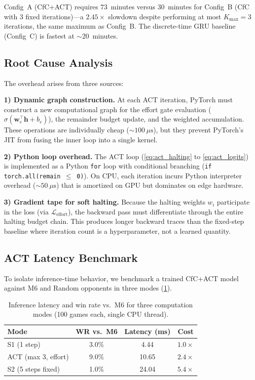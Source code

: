 \documentclass[conference]{IEEEtran}
\begin{document}
Config~A (CfC+ACT) requires $73$~minutes versus $30$~minutes for Config~B (CfC with 3 fixed iterations)---a $2.45\times$ slowdown despite performing at most $K_{\max} = 3$ iterations, the same maximum as Config~B. The discrete-time GRU baseline (Config~C) is fastest at $\sim$20~minutes.

\subsection{Root Cause Analysis}
\label{ssec:root_cause}

The overhead arises from three sources:

\textbf{1) Dynamic graph construction.} At each ACT iteration, PyTorch must construct a new computational graph for the effort gate evaluation ($\sigma(\bm{w}_e^\top \bm{h} + b_e)$), the remainder budget update, and the weighted accumulation. These operations are individually cheap ($\sim\!100~\mu\text{s}$), but they prevent PyTorch's JIT from fusing the inner loop into a single kernel.

\textbf{2) Python loop overhead.} The ACT loop (\cref{eq:act_halting} to \cref{eq:act_logits}) is implemented as a Python \texttt{for} loop with conditional branching (\texttt{if torch.all(remain $\leq$ 0)}). On CPU, each iteration incurs Python interpreter overhead ($\sim\!50~\mu\text{s}$) that is amortized on GPU but dominates on edge hardware.

\textbf{3) Gradient tape for soft halting.} Because the halting weights $w_i$ participate in the loss (via $\mathcal{L}_{\text{effort}}$), the backward pass must differentiate through the entire halting budget chain. This produces longer backward traces than the fixed-step baseline where iteration count is a hyperparameter, not a learned quantity.

\subsection{ACT Latency Benchmark}
\label{ssec:latency}

To isolate inference-time behavior, we benchmark a trained CfC+ACT model against M6 and Random opponents in three modes (\cref{tab:act_bench}).

\begin{table}[ht]
\centering
\caption{Inference latency and win rate vs.\ M6 for three computation modes (100 games each, single CPU thread).}
\label{tab:act_bench}
\begin{tabular}{@{}lccc@{}}
\toprule
\textbf{Mode} & \textbf{WR vs.\ M6} & \textbf{Latency (ms)} & \textbf{Cost} \\
\midrule
S1 (1 step)          & 3.0\% & 4.44  & $1.0\times$ \\
ACT (max 3, effort)  & 9.0\% & 10.65 & $2.4\times$ \\
S2 (5 steps fixed)   & 1.0\% & 24.04 & $5.4\times$ \\
\bottomrule
\end{tabular}
\end{table}
\end{document}
